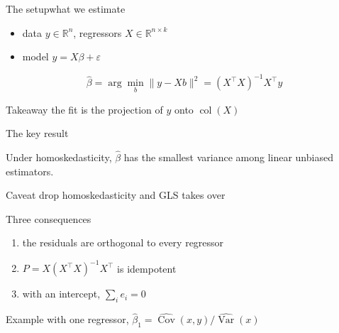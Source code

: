 
\begin{frame}{The setup}{what we estimate}
    \begin{itemize}
        \item data $y \in \mathbb{R}^n$, regressors $X \in \mathbb{R}^{n \times k}$
        \item model $y = X\beta + \varepsilon$
    \end{itemize}
    \[ \hat\beta = \arg\min_b \|y - Xb\|^2 = (X^\top X)^{-1} X^\top y \]

    \begin{block}{Takeaway}
        the fit is the projection of $y$ onto $\operatorname{col}(X)$
    \end{block}
\end{frame}

\begin{frame}{The key result}
\begin{theorem}
Under homoskedasticity, $\hat\beta$ has the smallest variance among linear
unbiased estimators.
\end{theorem}

\begin{alertblock}{Caveat}
    drop homoskedasticity and GLS takes over
\end{alertblock}
\end{frame}

\begin{frame}{Three consequences}
    \begin{enumerate}
        \item the residuals are orthogonal to every regressor
        \item $P = X(X^\top X)^{-1} X^\top$ is idempotent
        \item with an intercept, $\sum_i e_i = 0$
    \end{enumerate}

    \begin{exampleblock}{Example}
        with one regressor, $\hat\beta_1 = \widehat{\operatorname{Cov}}(x, y) / \widehat{\operatorname{Var}}(x)$
    \end{exampleblock}
\end{frame}
